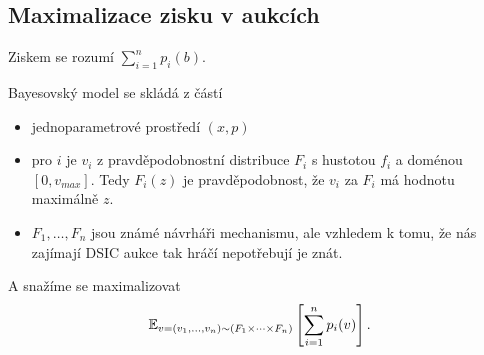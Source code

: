 \subsection{Maximalizace zisku v aukcích}
\begin{definition}\label{def:revenue}
    Ziskem se rozumí $\sum^n_{i=1} p_i(b)$. 
\end{definition}
\begin{definition}\label{def:bayes}
  Bayesovský model se skládá z částí 
  \begin{itemize}
    \item jednoparametrové prostředí $(x,p)$
    \item pro $i$ je $v_i$ z pravděpodobnostní distribuce $F_i$ s hustotou $f_i$ a doménou $[0,v_{max}]$. 
        Tedy $F_i(z)$ je pravděpodobnost, že $v_i$ za $F_i$ má hodnotu maximálně $z$. 
    \item $F_1,\dots,F_n$ jsou známé návrháři mechanismu, ale vzhledem k tomu, že nás zajímají DSIC aukce tak hráčí nepotřebují je znát. 
  \end{itemize} 
  A snažíme se maximalizovat 
  \[
      \E[v=(v_1,\dots,v_n) \sim (F_1\times \cdots \times F_n)]{\sum^n_{i=1} p_i(v)}. 
  \]
\end{definition}

